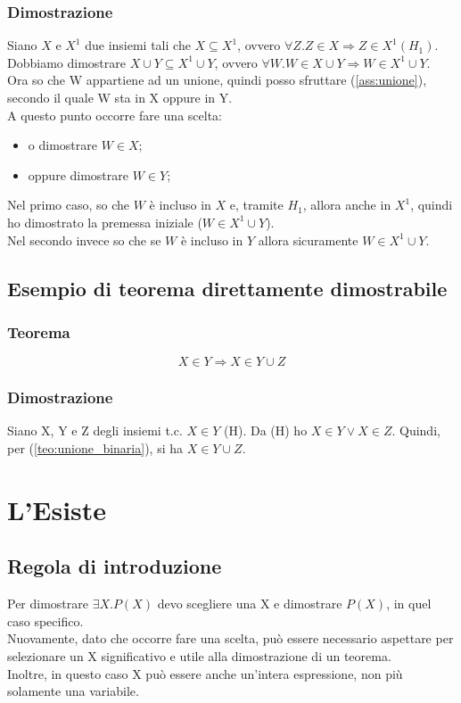 \documentclass[12pt]{article}
\begin{document}
\subsubsection{Dimostrazione}
Siano $X$ e $X^1$ due insiemi tali che $X \subseteq X^1$, ovvero $\forall Z.Z \in X \Rightarrow Z \in X^1 (H_1)$.\\
Dobbiamo dimostrare $X \cup Y \subseteq X^1 \cup Y$, ovvero $\forall W. W \in X \cup Y \Rightarrow W \in X^1 \cup Y$.\\
Ora so che W appartiene ad un unione, quindi posso sfruttare (\ref{ass:unione}), secondo il quale W sta in X oppure in Y.\\
A questo punto occorre fare una scelta: 
\begin{itemize}
    \item o dimostrare $W \in X$;
    \item oppure dimostrare $W \in Y$;
\end{itemize}
Nel primo caso, so che $W$ è incluso in $X$ e, tramite $H_1$, allora anche in $X^1$, quindi ho dimostrato la premessa iniziale ($W \in X^1 \cup Y$).\\
Nel secondo invece so che se $W$ è incluso in $Y$ allora sicuramente $W \in X^1 \cup Y$.
\subsection{Esempio di teorema direttamente dimostrabile}
\subsubsection{Teorema}
\[
    X \in Y \Rightarrow X \in Y \cup Z
\]
\subsubsection{Dimostrazione}
Siano X, Y e Z degli insiemi t.c. $X \in Y$ (H). Da (H) ho $X \in Y \vee X \in Z$. Quindi, per (\ref{teo:unione_binaria}), si ha $X \in Y \cup Z$.
\section{L'Esiste}
\subsection{Regola di introduzione}
Per dimostrare $\exists X. P(X)$ devo scegliere una X e dimostrare $P(X)$, in quel caso specifico.\\
Nuovamente, dato che occorre fare una scelta, può essere necessario aspettare per selezionare un X significativo e utile alla dimostrazione di un teorema.\\
Inoltre, in questo caso X può essere anche un'intera espressione, non più solamente una variabile.
\end{document}
